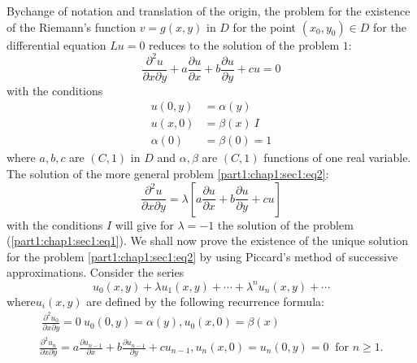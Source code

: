 By\pageoriginale change of notation and translation of the origin, the problem for
the existence of the Riemann's function $v=g(x,y)$ in $D$ for the
point $(x_0, y_0) \in D$ for the differential equation $Lu = 0$
reduces to the solution of the problem $1$: 
$$
\frac{\partial^2 u}{\partial x \partial y}+ a \frac{\partial
  u}{\partial x} + b \frac{\partial u}{\partial y} + cu = 0 
$$
with the conditions
\begin{align*}
  u(0,y) & = \alpha(y) \\
  u(x,0) & = \beta(x) ~ I\\
  \alpha(0) & = \beta (0) = 1
\end{align*}
where $a, b, c$ are $(C,1)$ in $D$ and $\alpha,\beta$ are $(C,1)$
functions of one real variable. The solution of the more general
problem \ref{part1:chap1:sec1:eq2}: 
$$
\frac{\partial^2 u}{\partial x \partial y} = \lambda \left [ a
  \frac{\partial u}{\partial x} + b \frac{\partial u}{\partial y} + cu
  \right] 
$$
with the conditions $I$ will give for $\lambda = -1$ the solution of
the problem (\ref{part1:chap1:sec1:eq1}). We shall now prove the existence of the unique
solution for the problem \ref{part1:chap1:sec1:eq2} by using Piccard's method of successive
approximations. Consider the series 
\begin{equation}
  u_0 (x,y) + \lambda u_1 (x,y) + \cdots + \lambda^n u_n (x,y) +
  \cdots \tag{5}\label{part1:chap1:sec2:eq5} 
\end{equation}
where\pageoriginale $u_i (x,y)$ are defined by the following recurrence formula:
\begin{multline*}
  ~\frac{\partial^2 u_0}{\partial x \partial y} = 0~ u_0(0,y) =
  \alpha(y), u_0 (x,0) = \beta(x) \\ 
  \frac{\partial^2 u_n}{\partial x \partial y} = a \frac{\partial
    u_{n-1}}{\partial x} + b \frac{\partial u_{n-1}}{\partial y}+
  cu_{n-1}, u_n(x,0) = u_n(0,y) =0 ~\text{ for } n \geq 1. 
\end{multline*}

